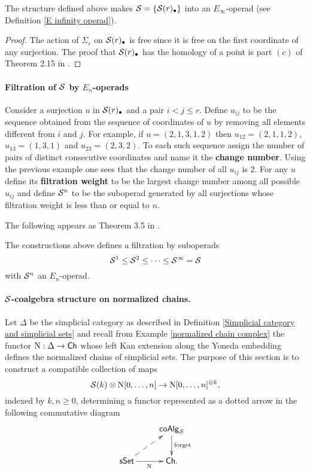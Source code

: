 \documentclass[thesis.tex]{subfiles}
\begin{document}
\begin{lemma}
The structure defined above makes $\S=\{\S(r)_\bullet\}$ into an $E_{\infty}$-operad (see Definition \ref{E infinity operad}).
\begin{proof}
The action of $\Sigma_r$ on $\S(r)_\bullet$ is free since it is free on the first coordinate of any surjection. The proof that $\S(r)_\bullet$ has the homology of a point is part $(c)$ of Theorem 2.15 in \cite{MS03}.
\end{proof}
\end{lemma}

\paragraph{Filtration of $\S$ by $E_n$-operads}

Consider a surjection $u$ in $\S(r)_\bullet$ and a pair $i<j\leq r$. Define $u_{ij}$ to be the sequence obtained from the sequence of coordinates of $u$ by removing all elements different from $i$ and $j$. For example, if $u=(2,1,3,1,2)$ then $u_{12}=(2,1,1,2)$, $u_{13}=(1,3,1)$ and $u_{23}=(2,3,2)$. To each such sequence assign the number of pairs of distinct consecutive coordinates and name it the \textbf{change number}. Using the previous example one sees that the change number of all $u_{ij}$ is $2$. For any $u$ define its \textbf{filtration weight} to be the largest change number among all possible $u_{ij}$ and define $\S^n$ to be the suboperad generated by all surjections whose filtration weight is less than or equal to $n$.

The following appears as Theorem 3.5 in \cite{MS03}.
\begin{lemma}\label{filtration by E_n}
The constructions above defines a filtration by suboperads
$$\S^1\leq\S^2\leq\dotsb\leq\S^\infty=\S$$
with $\S^n$ an $E_n$-operad.
\end{lemma}

\paragraph{$\S$-coalgebra structure on normalized chains.} Let $\Delta$ be the simplicial category as described in Definition \ref{Simplicial category and simplicial sets} and recall from Example \ref{normalized chain complex} the functor $\chains:\Delta\to\Ch$ whose left Kan extension along the Yoneda embedding defines the normalized chains of simplicial sets. The purpose of this section is to construct a compatible collection of maps
$$\S(k)\tensor\chains[0,\dotsc,n]\to\chains[0,\dotsc,n]^{\tensor k},$$
indexed by $k,n\geq0$, determining a functor represented as a dotted arrow in the following commutative diagram
$$\xymatrix{ & \coAlg_{\S}\ar[d]^{\text{forget}}\\ \sSet \ar[r]_{\chains}\ar@{-->}[ru] & \Ch.}$$
\end{document}
